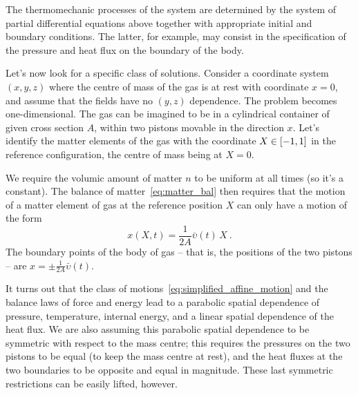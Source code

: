 \documentclass[\ifafour a4paper,12pt,\else a5paper,10pt,\fi%
onecolumn,oneside,article,%
british%
]{memoir}
\theoremstyle{remark}
\theoremstyle{innote}
\DeclarePairedDelimiter\clcl{[}{]}
\renewcommand*{\|}[1][]{\nonscript\,#1\vert\nonscript\;\mathopen{}}
\newcommand*{\yVb}{\bar{\upsilon}}
\begin{document}
The thermomechanic processes of the system are determined by the system of
partial differential equations above together with appropriate initial and
boundary conditions. The latter, for example, may consist in the
specification of the pressure and heat flux on the boundary of the body.

\bigskip

Let's now look for a specific class of solutions. Consider a coordinate
system $(x,y,z)$ where the centre of mass of the gas is at rest with
coordinate $x=0$, and assume that the fields have no $(y,z)$ dependence.
The problem becomes one-dimensional. The gas can be imagined to be in a
cylindrical container of given cross section $A$, within two pistons
movable in the direction $x$. Let's identify the matter elements of the gas
with the coordinate $X \in \clcl{-1, 1}$ in the reference configuration,
the centre of mass being at $X=0$.

We require the volumic amount of matter $n$ to be uniform at all times (so
it's a constant). The balance of matter~\eqref{eq:matter_bal} then requires
that the motion of a matter element of gas at the reference position $X$
can only have a motion of the form
\begin{equation}
  \label{eq:simplified_affine_motion}
  x(X,t) = \frac{1}{2A}\yVb(t) \, X \ .
\end{equation}
The boundary points of the body of gas -- that is, the positions of the two
pistons -- are $x=\pm\frac{1}{2A}\yVb(t)$.


It turns out that the class of motions~\eqref{eq:simplified_affine_motion}
and the balance laws of force and energy lead to a parabolic spatial
dependence of pressure, temperature, internal energy, and a linear spatial
dependence of the heat flux. We are also assuming this parabolic spatial
dependence to be symmetric with respect to the mass centre; this requires
the pressures on the two pistons to be equal (to keep the mass centre at
rest), and the heat fluxes at the two boundaries to be opposite and equal
in magnitude. These last symmetric restrictions can be easily lifted,
however.
\end{document}
